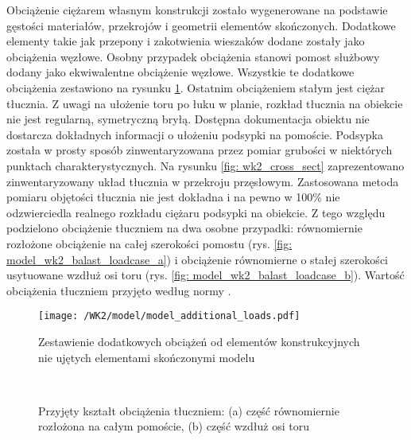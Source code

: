 Obciążenie ciężarem własnym konstrukcji zostało wygenerowane na podstawie gęstości materiałów, przekrojów i geometrii elementów skończonych. Dodatkowe elementy takie jak przepony i zakotwienia wieszaków dodane zostały jako obciążenia węzłowe. Osobny przypadek obciążenia stanowi pomost służbowy dodany jako ekwiwalentne obciążenie węzłowe. Wszystkie te dodatkowe obciążenia zestawiono na rysunku \ref{fig: model_wk2_add_loads}. Ostatnim obciążeniem stałym jest ciężar tłucznia. Z uwagi na ułożenie toru po łuku w planie, rozkład tłucznia na obiekcie nie jest regularną, symetryczną bryłą. Dostępna dokumentacja obiektu nie dostarcza dokładnych informacji o ułożeniu podsypki na pomoście. Podsypka została w prosty sposób zinwentaryzowana przez pomiar grubości w niektórych punktach charakterystycznych. Na rysunku \ref{fig: wk2_cross_sect} zaprezentowano zinwentaryzowany układ tłucznia w przekroju przęsłowym. Zastosowana metoda pomiaru objętości tłucznia nie jest dokładna i na pewno w 100\% nie odzwierciedla realnego rozkładu ciężaru podsypki na obiekcie. Z tego względu podzielono obciążenie tłuczniem na dwa osobne przypadki: równomiernie rozłożone obciążenie na całej szerokości pomostu (rys. \ref{fig: model_wk2_balast_loadcase_a}) i obciążenie równomierne o stałej szerokości usytuowane wzdłuż osi toru (rys. \ref{fig: model_wk2_balast_loadcase_b}). Wartość obciążenia tłuczniem przyjęto według normy \parencite{PKNg}. 

\begin{figure}[hbt!]
	\centering
	\texttt{[image: /WK2/model/model\_additional\_loads.pdf]}
	\captionsetup{justification=centering}
	\caption{Zestawienie dodatkowych obciążeń od elementów konstrukcyjnych nie ujętych elementami skończonymi modelu}
	\label{fig: model_wk2_add_loads}
\end{figure}

\begin{figure}[hbt!]
	\centering
	 \\
	\captionsetup{justification=centering}
	\caption{Przyjęty kształt obciążenia tłuczniem: (a) część równomiernie rozłożona na całym pomoście, (b) część wzdłuż osi toru}
	\label{fig: model_wk2_balast_loadcase}
\end{figure}



